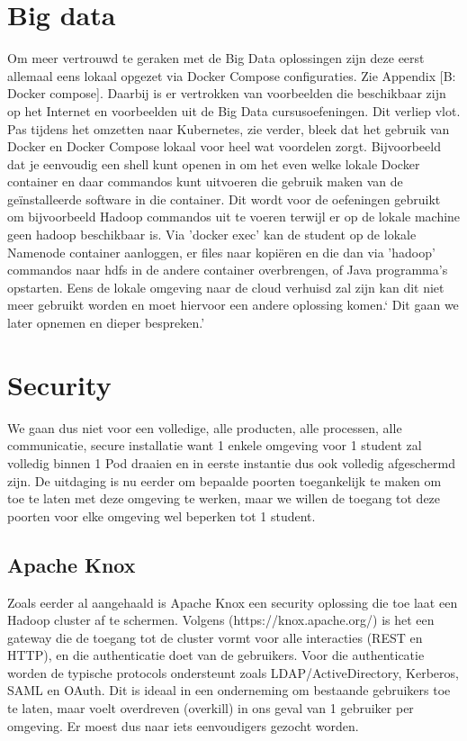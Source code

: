 \section{Big data}

Om meer vertrouwd te geraken met de Big Data oplossingen zijn deze eerst allemaal eens lokaal opgezet via Docker Compose configuraties. Zie Appendix [B: Docker compose].
Daarbij is er vertrokken van voorbeelden die beschikbaar zijn op het Internet en voorbeelden uit de Big Data cursusoefeningen.
\newline
\newline
Dit verliep vlot. Pas tijdens het omzetten naar Kubernetes, zie verder, bleek dat het gebruik van Docker en Docker Compose lokaal voor heel wat voordelen zorgt. Bijvoorbeeld dat je eenvoudig een shell kunt openen in om het even welke lokale Docker container en daar commandos kunt uitvoeren die gebruik maken van de geïnstalleerde software in die container. Dit wordt voor de oefeningen gebruikt om bijvoorbeeld Hadoop commandos uit te voeren terwijl er op de lokale machine geen hadoop beschikbaar is. Via 'docker exec' kan de student op de lokale Namenode container aanloggen, er files naar kopiëren en die dan via 'hadoop' commandos naar hdfs in de andere container overbrengen, of Java programma's opstarten.
Eens de lokale omgeving naar de cloud verhuisd zal zijn kan dit niet meer gebruikt worden en moet hiervoor een andere oplossing komen.` Dit gaan we later opnemen en dieper bespreken.'

\section{Security}
We gaan dus niet voor een volledige, alle producten, alle processen, alle communicatie, secure installatie want 1 enkele omgeving voor 1 student zal volledig binnen 1 Pod draaien en in eerste instantie dus ook volledig afgeschermd zijn.
De uitdaging is nu eerder om bepaalde poorten toegankelijk te maken om toe te laten met deze omgeving te werken, maar we willen de toegang tot deze poorten voor elke omgeving wel beperken tot 1 student.

\subsection{Apache Knox}
Zoals eerder al aangehaald is Apache Knox een security oplossing die toe laat een Hadoop cluster af te schermen.
Volgens (https://knox.apache.org/) is het een gateway die de toegang tot de cluster vormt voor alle interacties (REST en HTTP), en die authenticatie doet van de gebruikers. Voor die authenticatie worden de typische protocols ondersteunt zoals LDAP/ActiveDirectory, Kerberos, SAML en OAuth. Dit is ideaal in een onderneming om bestaande gebruikers toe te laten, maar voelt overdreven (overkill) in ons geval van 1 gebruiker per omgeving. Er moest dus naar iets eenvoudigers gezocht worden.


